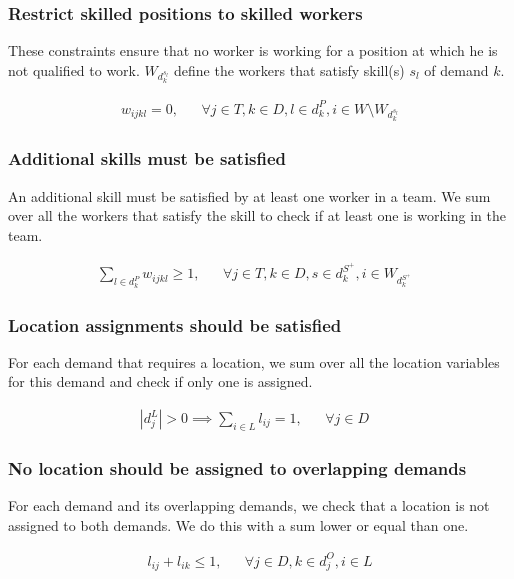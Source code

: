 \documentclass[../../thesis.tex]{subfiles}
\begin{document}
\subsubsection{Restrict skilled positions to skilled workers}

These constraints ensure that no worker is working for a position at which he is not qualified to work.
$W_{d^{s_l}_k}$ define the workers that satisfy skill(s) $s_l$ of demand $k$. 

\begin{align}
  w_{ijkl} = 0, && \forall j \in T, k \in D, l \in d^P_k, i \in W \setminus W_{d^{s_l}_k}  \label{wc6}
\end{align}

\subsubsection{Additional skills must be satisfied}

An additional skill must be satisfied by at least one worker in a team. We sum 
over all the workers that satisfy the skill to check if at least one is working in the team.

\begin{align}
  \sum_{l \in d_k^P} w_{ijkl} \geq 1, && \forall j \in T, k \in D, s \in d^{S^+}_k, i \in W_{d^{S^+}_k}& \label{wc8}
\end{align}


\subsubsection{Location assignments should be satisfied}

For each demand that requires a location, we sum over all the location variables for this demand and check if only one is assigned.

\begin{align}
  |d^L_j| > 0 \implies \sum_{i \in L} l_{ij} = 1, && \forall j \in D& \label{lc2}
\end{align}

\subsubsection{No location should be assigned to overlapping demands}

For each demand and its overlapping demands, we check that a location is not assigned to both demands.
We do this with a sum lower or equal than one.

\begin{align}
  l_{ij} + l_{ik} \leq 1, && \forall j \in D, k \in d^O_j, i \in L \label{lc3}
\end{align}
\end{document}
